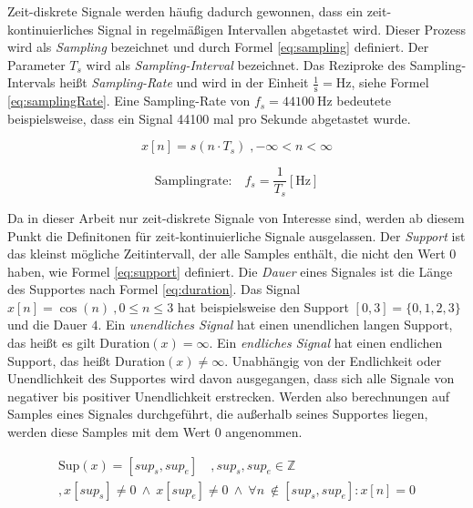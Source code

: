 Zeit-diskrete Signale werden häufig dadurch gewonnen, dass ein zeit-kontinuierliches Signal in regelmäßigen Intervallen abgetastet wird. Dieser Prozess wird als \emph{Sampling} bezeichnet und durch Formel \ref{eq:sampling} definiert. Der Parameter $T_s$ wird als \emph{Sampling-Interval} bezeichnet. Das Reziproke des Sampling-Intervals heißt \emph{Sampling-Rate} und wird in der Einheit $\frac{1}{\text{s}} = \text{Hz}$, siehe Formel \ref{eq:samplingRate}. Eine Sampling-Rate von $f_s = \SI{44100}{\hertz}$ bedeutete beispielsweise, dass ein Signal 44100 mal pro Sekunde abgetastet wurde.\cite[S. 24]{dspMichigan}

\begin{equation}
x[n] = s(n \cdot T_s) \; , -\infty < n < \infty
\label{eq:sampling}
\end{equation}
	
\begin{equation}
	\text{Samplingrate:} \quad f_s = \frac{1}{T_s} [\text{Hz}]
	\label{eq:samplingRate}
\end{equation}	
	
Da in dieser Arbeit nur zeit-diskrete Signale von Interesse sind, werden ab diesem Punkt die Definitonen für zeit-kontinuierliche Signale ausgelassen. Der \emph{Support} ist das kleinst mögliche Zeitintervall, der alle Samples enthält, die nicht den Wert 0 haben, wie Formel \ref{eq:support} definiert. Die \emph{Dauer} eines Signales ist die Länge des Supportes nach Formel \ref{eq:duration}. Das Signal $x[n] = \cos(n) \: ,0\leq n \leq 3$ hat beispielsweise den Support $[0,3] = \{0,1,2,3\} $ und die Dauer $4$. Ein \emph{unendliches Signal} hat einen unendlichen langen Support, das heißt es gilt Duration$(x) = \infty$. Ein \emph{endliches Signal} hat einen endlichen Support, das heißt Duration$(x) \neq\infty$. Unabhängig von der Endlichkeit oder Unendlichkeit des Supportes wird davon ausgegangen, dass sich alle Signale von negativer bis positiver Unendlichkeit erstrecken. Werden also berechnungen auf Samples eines Signales durchgeführt, die außerhalb seines Supportes liegen, werden diese Samples mit dem Wert 0 angenommen. \cite[S. 24]{dspMichigan}

\begin{equation}
\label{eq:support}
\begin{split}
\text{Sup}(x) = [sup_s, sup_e] \quad , sup_s, sup_e \in \mathbb{Z} \\,  x[sup_s] \neq 0 \:  \wedge \:  x[sup_e] \neq 0 \: \wedge \: \forall n \
\not\in [sup_s, sup_e] : x[n] = 0
\end{split}
\end{equation}

